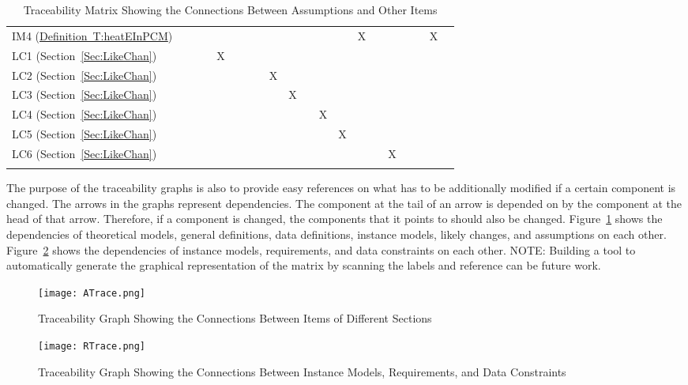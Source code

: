 \documentclass[12pt]{article}
\begin{document}
\begin{longtable}{l l l l l l l l l l l l l l l l l l l l}
IM4 (\hyperref[T:heatEInPCM]{Definition~T:heatEInPCM}) &  &  &  &  &  &  &  &  &  &  &  &  & X &  &  &  &  & X & 
\\
LC1 (Section~\ref{Sec:LikeChan}) &  &  &  & X &  &  &  &  &  &  &  &  &  &  &  &  &  &  & 
\\
LC2 (Section~\ref{Sec:LikeChan}) &  &  &  &  &  &  &  & X &  &  &  &  &  &  &  &  &  &  & 
\\
LC3 (Section~\ref{Sec:LikeChan}) &  &  &  &  &  &  &  &  & X &  &  &  &  &  &  &  &  &  & 
\\
LC4 (Section~\ref{Sec:LikeChan}) &  &  &  &  &  &  &  &  &  &  & X &  &  &  &  &  &  &  & 
\\
LC5 (Section~\ref{Sec:LikeChan}) &  &  &  &  &  &  &  &  &  &  &  & X &  &  &  &  &  &  & 
\\
LC6 (Section~\ref{Sec:LikeChan}) &  &  &  &  &  &  &  &  &  &  &  &  &  &  & X &  &  &  & 
\\
\bottomrule
\caption{Traceability Matrix Showing the Connections Between Assumptions and Other Items}
\label{Table:TracMatrShowtheConnBetwAssuandOtheItem}
\end{longtable}
The purpose of the traceability graphs is also to provide easy references on what has to be additionally modified if a certain component is changed. The arrows in the graphs represent dependencies. The component at the tail of an arrow is depended on by the component at the head of that arrow. Therefore, if a component is changed, the components that it points to should also be changed. Figure~\ref{Figure:TracGrapShowtheConnBetwItemofDiffSect} shows the dependencies of theoretical models, general definitions, data definitions, instance models, likely changes, and assumptions on each other. Figure~\ref{Figure:TracGrapShowtheConnBetwInstModeRequandDataCons} shows the dependencies of instance models, requirements, and data constraints on each other.
NOTE: Building a tool to automatically generate the graphical representation of the matrix by scanning the labels and reference can be future work.
\begin{figure}
\begin{center}
\texttt{[image: ATrace.png]}
\caption{Traceability Graph Showing the Connections Between Items of Different Sections}
\label{Figure:TracGrapShowtheConnBetwItemofDiffSect}
\end{center}
\end{figure}
\begin{figure}
\begin{center}
\texttt{[image: RTrace.png]}
\caption{Traceability Graph Showing the Connections Between Instance Models, Requirements, and Data Constraints}
\label{Figure:TracGrapShowtheConnBetwInstModeRequandDataCons}
\end{center}
\end{figure}
\end{document}
